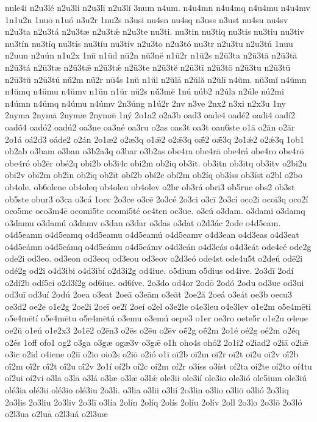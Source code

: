 {nule4i
n2u3lé
n2u3li
n2u3lī
n2u3lí
3num
n4um.
n4u4mn
n4u4mq
n4u4mu
n4u4mv
1n1u2n
1nuō
n1uó
n3u2r
1nu2s
n3usi
nu4sn
nu4sq
n3uss
n3ust
nu4su
nu4sv
n2u3ta
n2u3tá
n2u3tæ
n2u3tǽ
n2u3te
nu3ti.
nu3tin
nu3tiq
nu3tis
nu3tiu
nu3tiv
nu3tín
nu3tíq
nu3tís
nu3tíu
nu3tív
n2u3to
n2u3tó
nu3tr
n2u3tu
n2u3tú
1nuu
n2uun
n2uún
n1u2x
1nū
n1ūd
nū2n
nū3nĕ
n1ū2r
n1ū2s
n2ū3ta
n2ū3tā
n2ū3tă
n2ū3tá
n2ū3tæ
n2ū3tǣ
n2ū3tǽ
n2ū3te
n2ū3tĕ
n2ū3tī
n2ū3tō
n2ū3tu
n2ū3tū
n2ū3tŭ
n2ū3tú
nū́2m
nū́2r
nū4́s
1nŭ
n1ŭl
n2ŭlā
n2ŭlă
n2ŭlī
n4ŭm.
nŭ3mĭ
n4ŭmn
n4ŭmq
n4ŭmu
n4ŭmv
n1ŭn
n1ŭr
nŭ2s
nŭ́3mĕ
1nú
núb2
n2úla
n2úle
nú2mi
n4úmn
n4úmq
n4úmu
n4úmv
2n3úng
n1ú2r
2nv
n3ve
2nx2
n3xi
n2x3u
1ny
2nyma
2nymā
2nymæ
2nymǣ
1ný
2o1a2
o2a3b
oad3
oade4
oadé2
oadi4
oadí2
oadṓ4
oadó2
oadú2
oa3ne
oa3né
oa3ru
o2as
oas3t
oa3t
oau6ste
o1ā
o2ān
o2ār
2o1á
oá2d3
oáde2
o2án
2o1æ2
o2æ3q
o1ǣ2
o2ǣ3q
oǣ́2
oǣ́3q
2o1ǽ2
o2ǽ3q
1ob1
ob2ab
o3bam
o3ban
o3b2a3q
o3bar
o3b2as
obe4ra
obe4rā
obe4rá
obe4ro
obe4rō
obe4ró
ob2ēr
obé2q
obi2b
ob3i4c
obi2m
ob2iq
ob3it.
ob3itn
ob3itq
ob3itv
o2bi2u
obi2v
obī2m
ob2īn
ob2īq
ob2īt
obí2b
obí2c
obí2m
ob2íq
ob3íss
ob3íst
o2bl
o2bo
ob4ole.
ob6olene
ob4oleq
ob4oleu
ob4olev
o2br
ob3rá
obri3
ob5rue
obs2
ob3st
ob5ste
obur3
o3ca
o3cá
1occ
2o3ce
o3cē
2o3cé
2o3ci
o3cī
2o3cí
oco2i
ocoi3q
oco2í
oco5me
oco3m4ē
ocomi5te
ocomi5té
oc4ten
oc3ue.
o3cú
o3dam.
o3dami
o3damq
o3damu
o3damú
o3damv
o3dan
o3dar
o3das
o3dat
o2d3ác
2ode
o4d5eam.
o4d5eamn
o4d5eamq
o4d5eamu
o4d5eamú
o4d5eamv
o4d3ean
o4d3eas
o4d3eat
o4d5eámn
o4d5eámq
o4d5eámu
o4d5eámv
o4d3eán
o4d3eás
o4d3eát
ode4cé
ode2g
ode2i
od3eo.
od3eon
od3eoq
od3eou
od3eov
o2d3eó
ode4st
ode4u5t
o2deú
odē2i
odé2g
od2i
o4d3ibi
o4d3ibí
o2d3i2g
od4iue.
o5dium
o5dius
od4ive.
2o3dī
2odí
o2dí2b
odí5ci
o2d3í2g
od6íue.
od6íve.
2o3do
od4or
2odō
2odó
2odu
od3ue
od3ui
od3uī
od3uí
2odú
2oea
o3eat
2oeā
o3eām
o3eāt
2oe2ă
2oeá
o3eát
oe3b
oecu3
oe3d2
oe2e
o1e2g
2oe2i
2oeī
oe2ĭ
2oeí
o2el
o3e2le
o4e3leu
o4e3lev
o1e2m
o5e4mēti
o5e4mētí
o5e4mētu
o5e4mētú
o3emu
o3emú
oepe3
o1er
oe3ro
oete5r
o1e2u
o4eue
oe2ŭ
o1eú
o1e2x3
2o1ē2
o2ēn3
o2ēs
o2ēu
o2ēv
oḗ2g
oḗ2m
2o1é
oé2g
oé2m
o2éq
o2és
1off
ofo1
og2
o3ga
o3gæ
ogæ3v
o3gǣ
o1h
oho4s
ohó2
2o1i2
o2iad2
o2iā
o2iǣ
o3ic
o2id
o4iene
o2iī
o2io
oio2s
o2iō
o2ió
o1ī
oī2b
oī2m
oī2r
oī2t
oī2u
oī2v
oī́2b
oī́2m
oī́2r
oī́2t
oī́2u
oī́2v
2o1í
oí2b
oí2c
oí2m
oí2r
o3íss
o3íst
oí2ta
oí2te
oí2to
oí4tu
oí2ui
oí2vi
o3la
o3lā
o3lá
o3læ
o3lǣ
o3lǽ
ole3ii
ole3ií
ole3io
ole3ió
ole5ium
ole3iú
olé3ia
olé3ii
olé3io
olé3iu
2o3li.
o3lia
o3lii
o3lií
2o3lin
o3lio
o3liō
o3lió
2o3liq
2o3lis
2o3liu
2o3liv
2o3lī
o3lía
2olín
2olíq
2olís
2olíu
2olív
2oll
2o3lo
2o3lō
2o3ló
o2l3ua
o2luā
o2l3uá
o2l3uæ
}
